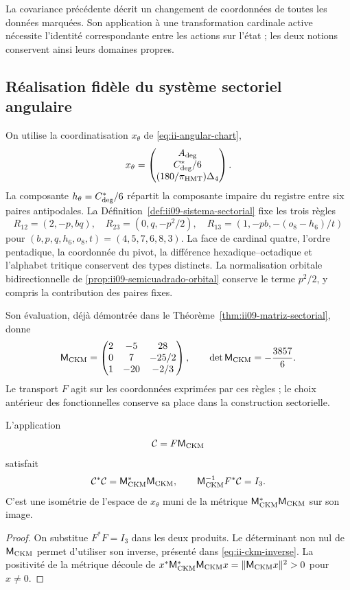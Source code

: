 La covariance précédente décrit un changement de coordonnées de toutes les
données marquées. Son application à une transformation cardinale active nécessite
l’identité correspondante entre les actions sur l’état ; les deux
notions conservent ainsi leurs domaines propres.

\subsection{Réalisation fidèle du système sectoriel angulaire}

On utilise la coordinatisation \(x_\theta\) de
\eqref{eq:ii-angular-chart},
\[
 x_\theta=\begin{pmatrix}A_{\rm deg}\\C^*_{\rm deg}/6\\
                              (180/\pi_{\rm HMT})\Delta_4\end{pmatrix}.
\]
La composante \(h_\theta=C^*_{\rm deg}/6\) répartit la composante
impaire du registre entre six paires antipodales. La
Définition~\ref{def:ii09-sistema-sectorial} fixe les trois règles
\[
 R_{12}=(2,-p,bq),\quad R_{23}=(0,q,-p^2/2),\quad
 R_{13}=(1,-pb,-(o_8-h_6)/t)
\]
pour \((b,p,q,h_6,o_8,t)=(4,5,7,6,8,3)\). La face de cardinal
quatre, l’ordre pentadique, la coordonnée du pivot, la différence
hexadique--octadique et l’alphabet tritique conservent des types distincts.
La normalisation orbitale bidirectionnelle de
\ref{prop:ii09-semicuadrado-orbital} conserve le terme \(p^2/2\),
y compris la contribution des paires fixes.

Son évaluation, déjà démontrée dans le
Théorème~\ref{thm:ii09-matriz-sectorial}, donne
\[
 \mathsf M_{\rm CKM}=
 \begin{pmatrix}2&-5&28\\0&7&-25/2\\1&-20&-2/3\end{pmatrix},
 \qquad\det\mathsf M_{\rm CKM}=-\frac{3857}{6}.
\]
Le transport \(F\) agit sur les coordonnées exprimées par ces
règles ; le choix antérieur des fonctionnelles conserve sa place dans la
construction sectorielle.

\begin{corollary}
\label{cor:ii-witt-composed-reader}
L'application
\begin{equation}
 \mathcal C=F\mathsf M_{\rm CKM}
 \label{eq:ii-witt-composed-reader}
\end{equation}
satisfait
\[
 \mathcal C^*\mathcal C=\mathsf M_{\rm CKM}^*\mathsf M_{\rm CKM},
 \qquad
 \mathsf M_{\rm CKM}^{-1}F^*\mathcal C=I_3.
\]
C’est une isométrie de l’espace de \(x_\theta\) muni de la métrique
\(\mathsf M_{\rm CKM}^*\mathsf M_{\rm CKM}\) sur son image.
\end{corollary}
\begin{proof}
On substitue \(F^*F=I_3\) dans les deux produits. Le déterminant non
nul de \(\mathsf M_{\rm CKM}\) permet d’utiliser son inverse,
présenté dans \eqref{eq:ii-ckm-inverse}. La positivité de la métrique
découle de
\(x^*\mathsf M_{\rm CKM}^*\mathsf M_{\rm CKM}x
=\|\mathsf M_{\rm CKM}x\|^2>0\) pour \(x\ne0\).
\end{proof}

